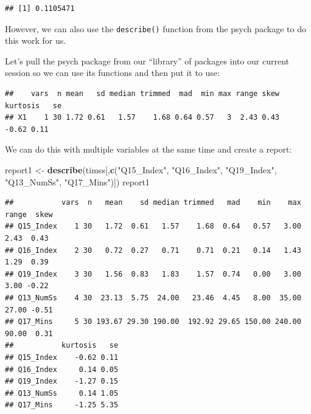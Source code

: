 \documentclass[
]{article}
\newenvironment{Shaded}{\begin{snugshade}}{\end{snugshade}}
\newcommand{\KeywordTok}[1]{\textcolor[rgb]{0.13,0.29,0.53}{\textbf{#1}}}
\newcommand{\NormalTok}[1]{#1}
\newcommand{\OperatorTok}[1]{\textcolor[rgb]{0.81,0.36,0.00}{\textbf{#1}}}
\newcommand{\StringTok}[1]{\textcolor[rgb]{0.31,0.60,0.02}{#1}}
\begin{document}
\begin{verbatim}
## [1] 0.1105471
\end{verbatim}

However, we can also use the \texttt{describe()} function from the psych package to do this work for us.

Let's pull the psych package from our ``library'' of packages into our current session so we can use its functions and then put it to use:

\begin{Shaded}
\end{Shaded}

\begin{verbatim}
##    vars  n mean   sd median trimmed  mad  min max range skew kurtosis   se
## X1    1 30 1.72 0.61   1.57    1.68 0.64 0.57   3  2.43 0.43    -0.62 0.11
\end{verbatim}

We can do this with multiple variables at the same time and create a report:

\begin{Shaded}
\begin{Highlighting}[]
\NormalTok{report1 <-}\StringTok{ }\KeywordTok{describe}\NormalTok{(timss[,}\KeywordTok{c}\NormalTok{(}\StringTok{"Q15_Index"}\NormalTok{,}
                             \StringTok{"Q16_Index"}\NormalTok{,}
                             \StringTok{"Q19_Index"}\NormalTok{,}
                             \StringTok{"Q13_NumSs"}\NormalTok{,}
                             \StringTok{"Q17_Mins"}\NormalTok{)])}
\NormalTok{report1}
\end{Highlighting}
\end{Shaded}

\begin{verbatim}
##           vars  n   mean    sd median trimmed   mad    min    max range  skew
## Q15_Index    1 30   1.72  0.61   1.57    1.68  0.64   0.57   3.00  2.43  0.43
## Q16_Index    2 30   0.72  0.27   0.71    0.71  0.21   0.14   1.43  1.29  0.39
## Q19_Index    3 30   1.56  0.83   1.83    1.57  0.74   0.00   3.00  3.00 -0.22
## Q13_NumSs    4 30  23.13  5.75  24.00   23.46  4.45   8.00  35.00 27.00 -0.51
## Q17_Mins     5 30 193.67 29.30 190.00  192.92 29.65 150.00 240.00 90.00  0.31
##           kurtosis   se
## Q15_Index    -0.62 0.11
## Q16_Index     0.14 0.05
## Q19_Index    -1.27 0.15
## Q13_NumSs     0.14 1.05
## Q17_Mins     -1.25 5.35
\end{verbatim}
\end{document}
